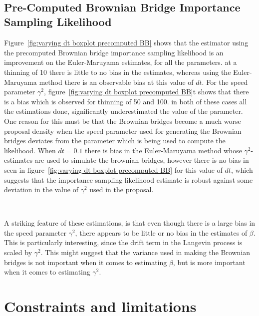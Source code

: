 \

\subsection{Pre-Computed Brownian Bridge Importance Sampling Likelihood}
Figure~\ref{fig:varying dt boxplot precomputed BB} shows that the estimator using the precomputed Brownian bridge importance sampling likelihood is an improvement on the Euler-Maruyama estimates, for all the parameters. at a thinning of 10 there is little to no bias in the estimates, whereas using the Euler-Maruyama method there is an observable bias at this value of $dt$. For the speed parameter $\gamma^2$, figure~\ref{fig:varying dt boxplot precomputed BB}t shows that there is a bias which is observed for thinning of 50 and 100. in both of these cases all the estimations done, significantly underestimated the value of the parameter. One reason for this must be that the Brownian bridges become a much worse proposal density when the speed parameter used for generating the Brownian bridges deviates from the parameter which is being used to compute the likelihood. 
When $dt=0.1$ there is bias in the Euler-Maruyama method whose $\gamma^2$-estimates are used to simulate the brownian bridges, however there is no bias in seen in figure~\ref{fig:varying dt boxplot precomputed BB} for this value of $dt$, which suggests that the importance sampling likelihood estimate is robust against some deviation in the value of $\gamma^2$ used in the proposal. 

\

A striking feature of these estimations, is that even though there is a large bias in the speed parameter $\gamma^2$, there appears to be little or no bias in the estimates of $\beta$. This is particularly interesting, since the drift term in the Langevin process is scaled by $\gamma^2$. This might suggest that the variance used in making the Brownian bridges is not important when it comes to estimating $\beta$, but is more important when it comes to estimating $\gamma^2$.











\section{Constraints and limitations}







